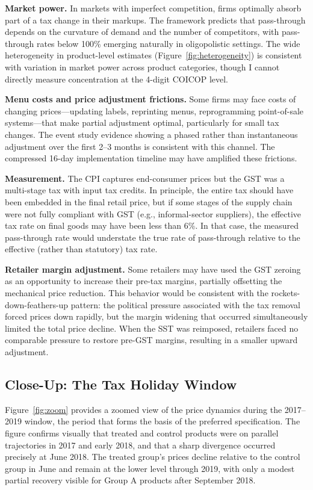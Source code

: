 \documentclass[12pt]{article}
\begin{document}
\textbf{Market power.} In markets with imperfect competition, firms optimally absorb part of a tax change in their markups. The \citet{weyl2013} framework predicts that pass-through depends on the curvature of demand and the number of competitors, with pass-through rates below 100\% emerging naturally in oligopolistic settings. The wide heterogeneity in product-level estimates (Figure~\ref{fig:heterogeneity}) is consistent with variation in market power across product categories, though I cannot directly measure concentration at the 4-digit COICOP level.

\textbf{Menu costs and price adjustment frictions.} Some firms may face costs of changing prices---updating labels, reprinting menus, reprogramming point-of-sale systems---that make partial adjustment optimal, particularly for small tax changes. The event study evidence showing a phased rather than instantaneous adjustment over the first 2--3 months is consistent with this channel. The compressed 16-day implementation timeline may have amplified these frictions.

\textbf{Measurement.} The CPI captures end-consumer prices but the GST was a multi-stage tax with input tax credits. In principle, the entire tax should have been embedded in the final retail price, but if some stages of the supply chain were not fully compliant with GST (e.g., informal-sector suppliers), the effective tax rate on final goods may have been less than 6\%. In that case, the measured pass-through rate would understate the true rate of pass-through relative to the effective (rather than statutory) tax rate.

\textbf{Retailer margin adjustment.} Some retailers may have used the GST zeroing as an opportunity to increase their pre-tax margins, partially offsetting the mechanical price reduction. This behavior would be consistent with the rockets-down-feathers-up pattern: the political pressure associated with the tax removal forced prices down rapidly, but the margin widening that occurred simultaneously limited the total price decline. When the SST was reimposed, retailers faced no comparable pressure to restore pre-GST margins, resulting in a smaller upward adjustment.

\subsection{Close-Up: The Tax Holiday Window}

Figure~\ref{fig:zoom} provides a zoomed view of the price dynamics during the 2017--2019 window, the period that forms the basis of the preferred specification. The figure confirms visually that treated and control products were on parallel trajectories in 2017 and early 2018, and that a sharp divergence occurred precisely at June 2018. The treated group's prices decline relative to the control group in June and remain at the lower level through 2019, with only a modest partial recovery visible for Group A products after September 2018.
\end{document}
